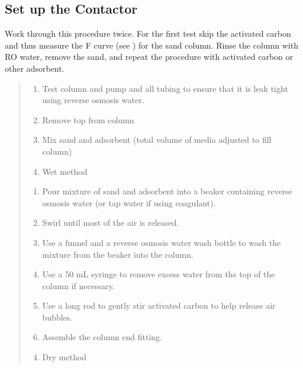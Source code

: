\documentclass[letterpaper,10pt,english]{sphinxmanual}
\begin{document}
\subsection{Set up the Contactor}
\label{\detokenize{Adsorption/Adsorption:set-up-the-contactor}}
Work through this procedure twice. For the first test skip the activated carbon and thus measure the F curve (see {\hyperref[\detokenize{Reactor_Characteristics/Reactor_Characteristics:heading-reactor-modeling}]{}}) for the sand column. Rinse the column with RO water, remove the sand, and repeat the procedure with activated carbon or other adsorbent.
\begin{quote}
\begin{enumerate}
\item {} 
Test column and pump and all tubing to ensure that it is leak tight using reverse osmosis water.

\item {} 
Remove top from column

\item {} 
Mix sand and adsorbent (total volume of media adjusted to fill column)

\item {} 
Wet method

\end{enumerate}
\begin{enumerate}
\item {} 
Pour mixture of sand and adsorbent into a beaker containing reverse osmosis water (or tap water if using coagulant).

\item {} 
Swirl until most of the air is released.

\item {} 
Use a funnel and a reverse osmosis water wash bottle to wash the mixture from the beaker into the column.

\item {} 
Use a 50 mL syringe to remove excess water from the top of the column if necessary.

\item {} 
Use a long rod to gently stir activated carbon to help release air bubbles.

\item {} 
Assemble the column end fitting.

\end{enumerate}
\begin{enumerate}
\setcounter{enumi}{3}
\item {} 
Dry method


\end{enumerate}
\end{quote}
\end{document}
